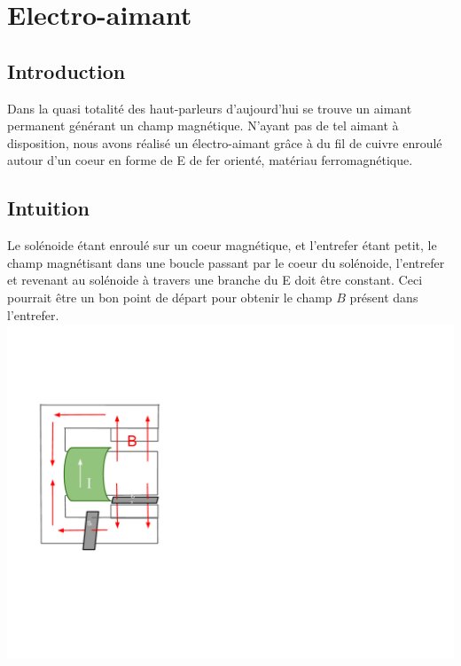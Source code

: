 \chapter{Electro-aimant}
\section{Introduction}
Dans la quasi totalité des haut-parleurs d'aujourd'hui se trouve un aimant permanent générant un champ magnétique.
N'ayant pas de tel aimant à disposition, nous avons réalisé un électro-aimant grâce à du fil de cuivre enroulé autour 
d'un coeur en forme de E de fer orienté, matériau ferromagnétique.
\section{Intuition}
Le solénoide étant enroulé sur un coeur magnétique, et l'entrefer étant petit, le champ magnétisant dans 
une boucle passant par le coeur du solénoide, l'entrefer et revenant au solénoide à travers une branche 
du E doit être constant. Ceci pourrait être un bon point de départ pour obtenir le champ $B$ présent dans l'entrefer.
\includegraphics{img/schema-aimant-bobine}
